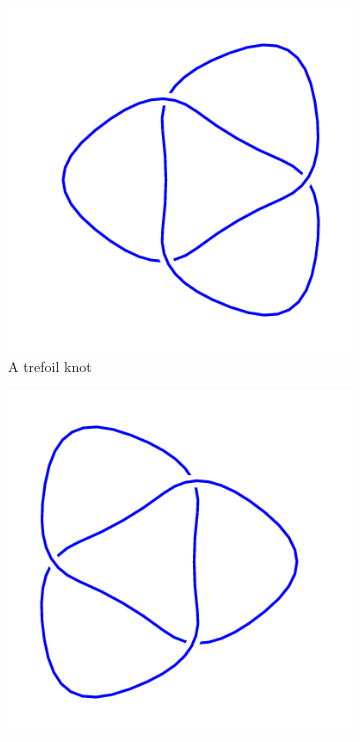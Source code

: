 \documentclass[12pt,letterpaper]{article}
\theoremstyle{definition}
\begin{document}
\begin{figure}[h]
    \centering
    \begin{subfigure}[b]{0.25\textwidth}
        \centering
        \includegraphics[width=\textwidth]{knotpics/3_1.png}
        \caption{A trefoil knot}
    \end{subfigure}
    \hspace{1cm}
    \begin{subfigure}[b]{0.25\textwidth}
        \centering
        \includegraphics[width=\textwidth]{knotpics/3_1mirror.png}

\end{subfigure}
\end{figure}
\end{document}
